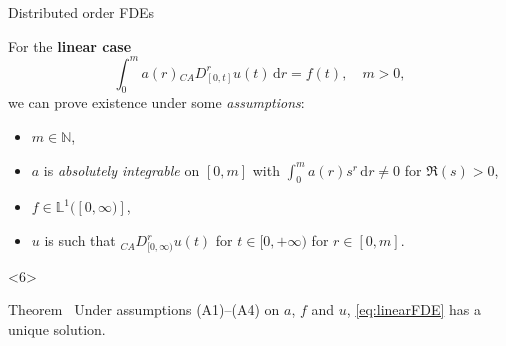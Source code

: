 \documentclass[aspectratio=169,xcolor=dvipsnames]{beamer}
\begin{document}
\begin{frame}{Distributed order FDEs}

For the \textbf{linear case} 
\begin{equation}\label{eq:linearFDE}
\int_{0}^{m} a(r) {}_{CA}D_{[0,t]}^r u(t)\,\mathrm{d}r = f(t), \quad m > 0, \tag{LDFODE}
\end{equation}
we can prove existence under some \emph{assumptions}:
\begin{itemize}
\item[(A1)] $m \in \mathbb{N}$,
\item[(A2)] $a$ is \emph{absolutely integrable} on $[0,m]$ with $\int_{0}^{m} a(r) s^r\,\mathrm{d}r \neq 0$ for $\Re(s) > 0$,
\item[(A3)] $f \in \mathbb{L}^1([0,\infty)]$,
\item[(A4)] $u$ is such that ${}_{CA} D^{r}_{[0,\infty)} u(t)$ for $t \in [0,+\infty)$ for $r \in [0,m]$.
\end{itemize}
\begin{onlyenv}<6>
\begin{alertblock}{Theorem~\parencite[Theorem~3.1]{DIETHELM200996}}
Under assumptions (A1)--(A4) on $a$, $f$ and $u$, \eqref{eq:linearFDE} has a unique solution. 
\end{alertblock}
\end{onlyenv}

\end{frame}
\end{document}
